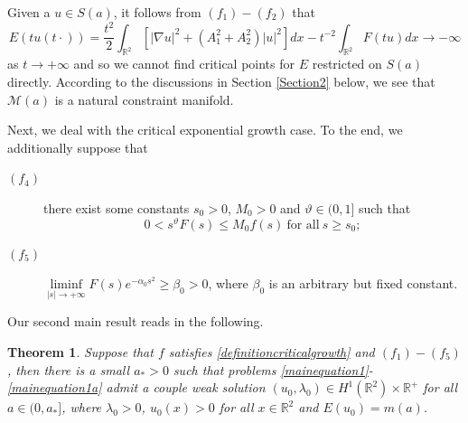 \documentclass[11pt]{amsart}
\numberwithin{equation}{section}
\newtheorem{theorem}{Theorem}[section]
\theoremstyle{definition}
\newcommand{\R}{\mathbb{R}}
\begin{document}
Given a $u\in S(a)$, it
follows from $(f_1)-(f_2)$ that
\[
E(tu(t\cdot))=\frac{t^2}2\int_{\R^2}[|\nabla u|^2 + (A_1^2+A_2^2)|u|^2]dx-t^{-2}\int_{\R^2}F(tu)dx\to-\infty
\]
as $t\to+\infty$ and so we cannot find critical points for $E$ restricted on $S(a)$ directly.
According to the discussions in Section \ref{Section2} below, we see that $\mathcal{M}(a)$
is a natural constraint manifold.

Next, we deal with the critical exponential growth case. To the end, we additionally suppose that
\begin{description}
	\item[$(f_4)$] there exist some constants $s_0>0$, $M_0>0$ and $\vartheta\in (0, 1]$ such that
	$$0<s^\vartheta F(s)\leq M_0f(s) ~\text{for all}~ s\geq s_0;$$
	\item[$(f_5)$] $\liminf\limits_{|s|\to+\infty}F(s)e^{-\alpha_0s^2}\geq\beta_0>0$, where $\beta_0$ is an arbitrary but fixed constant.
\end{description}

Our second main result reads in the following.

\begin{theorem}\label{maintheorem2}
Suppose that $f$ satisfies \eqref{definitioncriticalgrowth} and $(f_1)-(f_5)$,
then there is a small $a_*>0$ such that problems \eqref{mainequation1}-\eqref{mainequation1a}
admit a couple weak solution $(u_0,\lambda_0)\in H^1(\R^2)\times\R^+$ for all $a\in(0,a_*]$,
where $\lambda_0>0$, $u_0(x)>0$ for all $x\in\R^2$ and $E(u_0)=m(a)$.
\end{theorem}
\end{document}
